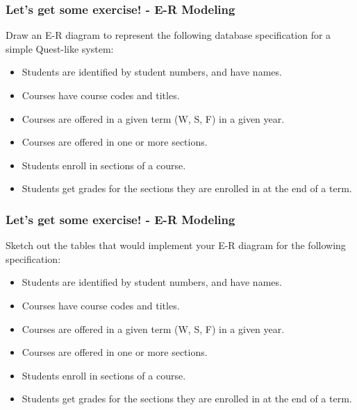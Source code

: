 \begin{frame}
\frametitle{Let's get some exercise! - E-R Modeling}

Draw an E-R diagram to represent the following database specification for a simple Quest-like system:\\
\begin{itemize}
  \item Students are identified by student numbers, and have names.
  \item Courses have course codes and titles.
  \item Courses are offered in a given term (W, S, F) in a given year.
  \item Courses are offered in one or more sections.
  \item Students enroll in sections of a course.
  \item Students get grades for the sections they are enrolled in at the end of a term.
\end{itemize}

\end{frame}


\begin{frame}
\frametitle{Let's get some exercise! - E-R Modeling}

Sketch out the tables that would implement your E-R diagram for the following specification:\\
\begin{itemize}
  \item Students are identified by student numbers, and have names.
  \item Courses have course codes and titles.
  \item Courses are offered in a given term (W, S, F) in a given year.
  \item Courses are offered in one or more sections.
  \item Students enroll in sections of a course.
  \item Students get grades for the sections they are enrolled in at the end of a term.
\end{itemize}

\end{frame}


